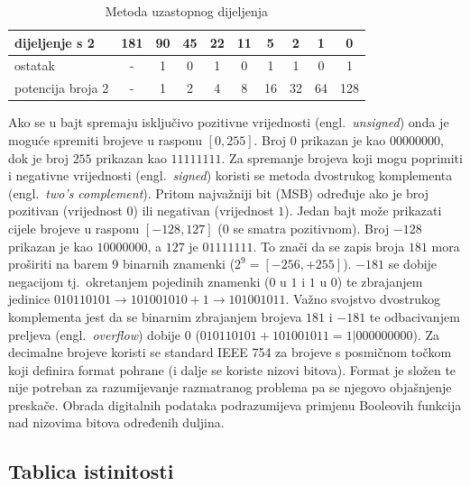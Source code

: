 \documentclass[times, utf8, diplomski]{fer}
\begin{document}
\begin{table}[htb]
	\centering
	\caption{Metoda uzastopnog dijeljenja}
	\label{tab:pretvorba}
	\begin{tabular}{|l|c|c|c|c|c|c|c|c|c|}
		\hline
		dijeljenje s 2 		& 181 	& 90 & 45 & 22 & 11 & 5  & 2  & 1  & 0		\\ \hline
		ostatak 			& -		& 1  & 0  & 1  & 0  & 1  & 1  & 0  & 1		\\ \hline
		potencija broja 2 	& -		& 1  & 2  & 4  & 8  & 16 & 32 & 64 & 128	\\ \hline
	\end{tabular}
\end{table}

Ako se u bajt spremaju isključivo pozitivne vrijednosti (engl.~\textit{unsigned}) onda je moguće spremiti brojeve u rasponu $[0, 255]$. Broj $0$ prikazan je kao $00000000$, dok je broj $255$ prikazan kao $11111111$. Za spremanje brojeva koji mogu poprimiti i negativne vrijednosti (engl.~\textit{signed}) koristi se metoda dvostrukog komplementa (engl.~\textit{two's complement}). Pritom najvažniji bit (MSB) određuje ako je broj pozitivan (vrijednost $0$) ili negativan (vrijednost $1$). Jedan bajt može prikazati cijele brojeve u rasponu $[-128, 127]$ ($0$ se smatra pozitivnom). Broj $-128$ prikazan je kao $10000000$, a $127$ je $01111111$. To znači da se zapis broja $181$ mora proširiti na barem 9 binarnih znamenki ($2^{9}=[-256, +255]$). $-181$ se dobije negacijom tj.~okretanjem pojedinih znamenki ($0$ u $1$ i $1$ u $0$) te zbrajanjem jedinice $010110101 \to 101001010 + 1 \to 101001011$. Važno svojstvo dvostrukog komplementa jest da se binarnim zbrajanjem brojeva $181$ i $-181$ te odbacivanjem preljeva (engl.~\textit{overflow}) dobije $0$ ($010110101 + 101001011 = 1|000000000$). Za decimalne brojeve koristi se standard IEEE 754 za brojeve s posmičnom točkom koji definira format pohrane (i dalje se koriste nizovi bitova). Format je složen te nije potreban za razumijevanje razmatranog problema pa se njegovo objašnjenje preskače. Obrada digitalnih podataka podrazumijeva primjenu Booleovih funkcija nad nizovima bitova određenih duljina.

\subsection{Tablica istinitosti}
\end{document}
